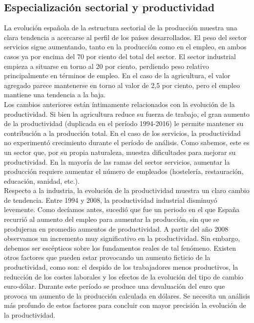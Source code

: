     \subsection{Especialización sectorial y productividad}
    La evolución española de la estructura sectorial de la producción muestra una clara tendencia a acercarse al perfil de los países desarrollados. El peso del sector servicios sigue aumentando, tanto en la producción como en el empleo, en ambos casos ya por encima del 70 por ciento del total del sector. El sector industrial empieza a situarse en torno al 20 por ciento, perdiendo peso relativo principalmente en términos de empleo. En el caso de la agricultura, el valor agregado parece mantenerse en torno al valor de 2,5 por ciento, pero el empleo mantiene una tendencia a la baja.\\
    Los cambios anteriores están íntimamente relacionados con la evolución de la productividad. Si bien la agricultura reduce su fuerza de trabajo, el gran aumento de la productividad (duplicada en el período 1994-2016) le permite mantener su contribución a la producción total. En el caso de los servicios, la productividad no experimentó crecimiento durante el período de análisis. Como sabemos, este es un sector que, por su propia naturaleza, muestra dificultades para mejorar su productividad. En la mayoría de las ramas del sector servicios, aumentar la producción requiere aumentar el número de empleados (hostelería, restauración, educación, sanidad, etc.).\\
    Respecto a la industria, la evolución de la productividad muestra un claro cambio de tendencia. Entre 1994 y 2008, la productividad industrial disminuyó levemente. Como decíamos antes, sucedió que fue un periodo en el que España recurrió al aumento del empleo para aumentar la producción, sin que se produjeran en promedio aumentos de productividad. A partir del año 2008 observamos un incremento muy significativo en la productividad. Sin embargo, debemos ser escépticos sobre los fundamentos reales de tal fenómeno. Existen otros factores que pueden estar provocando un aumento ficticio de la productividad, como son: el despido de los trabajadores menos productivos, la reducción de los costes laborales y los efectos de la evolución del tipo de cambio euro-dólar. Durante este período se produce una devaluación del euro que provoca un aumento de la producción calculada en dólares. Se necesita un análisis más profundo de estos factores para concluir con mayor precisión la evolución de la productividad.\\

